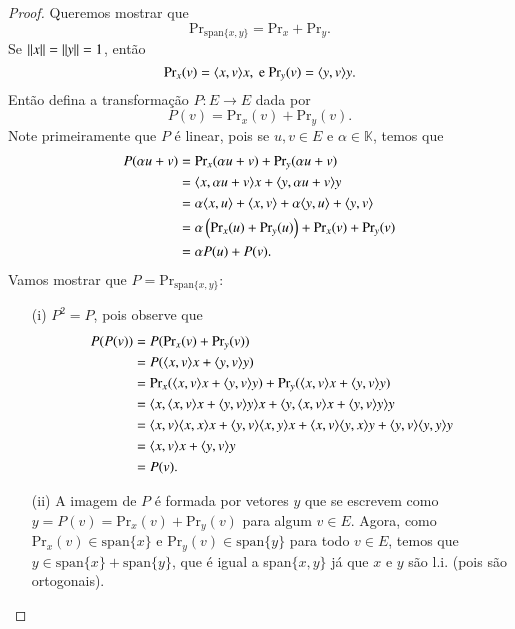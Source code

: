 \begin{proof}
	Queremos mostrar que
    \begin{equation*}
    	\text{Pr}_{\text{span}\{x,y\}} = \text{Pr}_{x}+\text{Pr}_{y}.
    \end{equation*}
	Se $\| x \|=\| y \|=1$, então 
    \begin{equation*}
    	\text{Pr}_{x}(v) = \langle x, v \rangle x, \text{ e } \text{Pr}_{y}(v) = \langle y, v \rangle y.
    \end{equation*}	
    Então defina a transformação $P:E\to E$ dada por
    \begin{equation*}
    	P(v) = \text{Pr}_x(v) + \text{Pr}_y(v).
    \end{equation*}
	Note primeiramente que $P$ é linear, pois se $u,v\in E$ e $\alpha \in {\mathbb{K}}$, temos que
    \begin{align*}
    	P(\alpha u + v) & = \text{Pr}_x(\alpha u + v) + \text{Pr}_y(\alpha u + v)\\
        & = \langle x, \alpha u + v \rangle x + \langle y, \alpha u + v \rangle y\\
        & = \alpha \langle x, u \rangle + \langle x, v \rangle + \alpha \langle y, u \rangle + \langle y, v \rangle\\
        & = \alpha \left( \text{Pr}_x(u) + \text{Pr}_y(u)\right) + \text{Pr}_x(v) + \text{Pr}_y(v)\\
        & = \alpha P(u) + P(v).
    \end{align*}
    Vamos mostrar que $P = \text{Pr}_{\text{span}\{x,y\}}$:
    \begin{itemize}
    	\item[(i)] $P^2=P$, pois observe que 
	    \begin{align*}	
    		P(P(v)) &= P(\text{Pr}_x(v) + \text{Pr}_y(v))\\
            &= P(\langle x, v \rangle x + \langle y, v \rangle y)\\
            &= \text{Pr}_x(\langle x, v \rangle x + \langle y, v \rangle y) + \text{Pr}_y(\langle x, v \rangle x + \langle y, v \rangle y)\\
            &= \langle x, \langle x, v \rangle x + \langle y, v \rangle y \rangle x + \langle y, \langle x, v \rangle x + \langle y, v \rangle y \rangle y\\
            &= \langle x, v \rangle\langle x, x \rangle x + \langle y, v \rangle\langle x, y \rangle x + \langle x, v \rangle\langle y, x \rangle y + \langle y, v \rangle\langle y, y \rangle y\\
            &= \langle x, v \rangle x + \langle y, v \rangle y\\
			&= P(v).
		\end{align*}
    \item[(ii)] A imagem de $P$ é formada por vetores $y$ que se escrevem como $y = P(v) = \text{Pr}_x(v) + \text{Pr}_y(v)$ para algum $v\in E$. Agora, como $\text{Pr}_x(v)\in \text{span}\{x\}$ e $\text{Pr}_y(v) \in \text{span}\{y\}$ para todo $v\in E$, temos que $y \in \text{span}\{x\}+\text{span}\{y\}$, que é igual a span$\{x,y\}$ já que $x$ e $y$ são l.i. (pois são ortogonais).

\end{itemize}
\end{proof}
